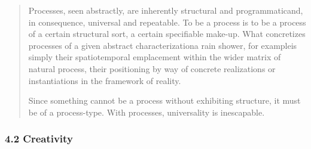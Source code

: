 \documentclass[a4paper]{Thesis}
\begin{document}
\begin{quotation}
	Processes, seen abstractly, are inherently structural and programmaticand, in
	consequence, universal and repeatable. To be a process is to be a process of a certain
	structural sort, a certain specifiable make-up. What concretizes processes of a given
	abstract characterizationa rain shower, for exampleis simply their spatiotemporal
	emplacement within the wider matrix of natural process, their positioning by way of
	concrete realizations or instantiations in the framework of reality.
	
	Since something
	cannot be a process without exhibiting structure, it must be of a process-type. With
	processes, universality is inescapable.
	
\end{quotation}

\subsubsection{4.2 Creativity}
\end{document}
